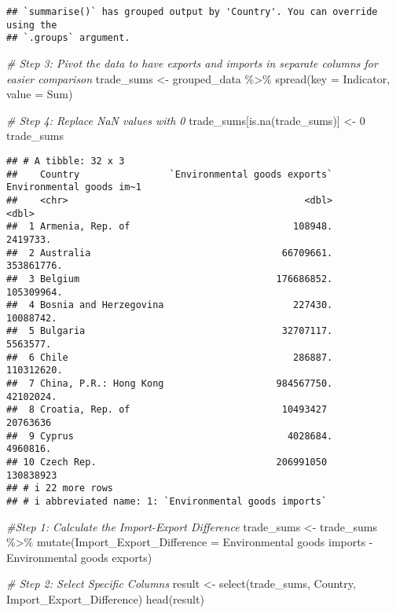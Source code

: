 \documentclass[
]{article}
\newenvironment{Shaded}{\begin{snugshade}}{\end{snugshade}}
\newcommand{\AttributeTok}[1]{\textcolor[rgb]{0.77,0.63,0.00}{#1}}
\newcommand{\CommentTok}[1]{\textcolor[rgb]{0.56,0.35,0.01}{\textit{#1}}}
\newcommand{\DecValTok}[1]{\textcolor[rgb]{0.00,0.00,0.81}{#1}}
\newcommand{\FunctionTok}[1]{\textcolor[rgb]{0.00,0.00,0.00}{#1}}
\newcommand{\NormalTok}[1]{#1}
\newcommand{\OtherTok}[1]{\textcolor[rgb]{0.56,0.35,0.01}{#1}}
\newcommand{\SpecialCharTok}[1]{\textcolor[rgb]{0.00,0.00,0.00}{#1}}
\newcommand{\StringTok}[1]{\textcolor[rgb]{0.31,0.60,0.02}{#1}}
\begin{document}
\begin{verbatim}
## `summarise()` has grouped output by 'Country'. You can override using the
## `.groups` argument.
\end{verbatim}

\begin{Shaded}
\begin{Highlighting}[]
\CommentTok{\# Step 3: Pivot the data to have exports and imports in separate columns for easier comparison}
\NormalTok{trade\_sums }\OtherTok{\textless{}{-}}\NormalTok{ grouped\_data }\SpecialCharTok{\%\textgreater{}\%}
  \FunctionTok{spread}\NormalTok{(}\AttributeTok{key =}\NormalTok{ Indicator, }\AttributeTok{value =}\NormalTok{ Sum)}

\CommentTok{\# Step 4: Replace NaN values with 0}
\NormalTok{trade\_sums[}\FunctionTok{is.na}\NormalTok{(trade\_sums)] }\OtherTok{\textless{}{-}} \DecValTok{0}
\NormalTok{trade\_sums}
\end{Highlighting}
\end{Shaded}

\begin{verbatim}
## # A tibble: 32 x 3
##    Country                `Environmental goods exports` Environmental goods im~1
##    <chr>                                          <dbl>                    <dbl>
##  1 Armenia, Rep. of                             108948.                 2419733.
##  2 Australia                                  66709661.               353861776.
##  3 Belgium                                   176686852.               105309964.
##  4 Bosnia and Herzegovina                       227430.                10088742.
##  5 Bulgaria                                   32707117.                 5563577.
##  6 Chile                                        286887.               110312620.
##  7 China, P.R.: Hong Kong                    984567750.                42102024.
##  8 Croatia, Rep. of                           10493427                 20763636 
##  9 Cyprus                                      4028684.                 4960816.
## 10 Czech Rep.                                206991050                130838923 
## # i 22 more rows
## # i abbreviated name: 1: `Environmental goods imports`
\end{verbatim}

\begin{Shaded}
\begin{Highlighting}[]
\CommentTok{\#Step 1: Calculate the Import{-}Export Difference}
\NormalTok{trade\_sums }\OtherTok{\textless{}{-}}\NormalTok{ trade\_sums }\SpecialCharTok{\%\textgreater{}\%}
  \FunctionTok{mutate}\NormalTok{(}\AttributeTok{Import\_Export\_Difference =} \StringTok{\textasciigrave{}}\AttributeTok{Environmental goods imports}\StringTok{\textasciigrave{}} \SpecialCharTok{{-}} \StringTok{\textasciigrave{}}\AttributeTok{Environmental goods exports}\StringTok{\textasciigrave{}}\NormalTok{)}

\CommentTok{\# Step 2: Select Specific Columns}
\NormalTok{result }\OtherTok{\textless{}{-}} \FunctionTok{select}\NormalTok{(trade\_sums, Country, Import\_Export\_Difference)}
\FunctionTok{head}\NormalTok{(result)}
\end{Highlighting}
\end{Shaded}
\end{document}
